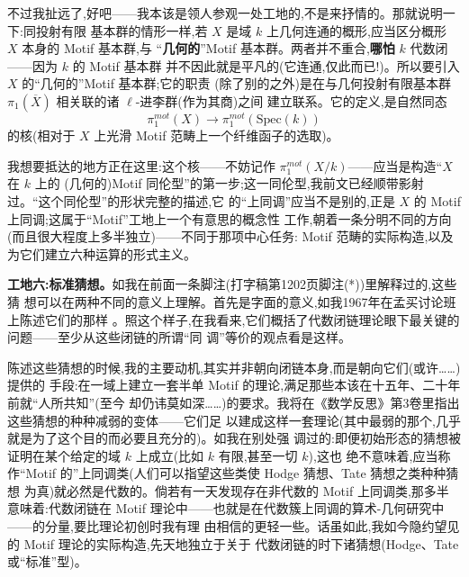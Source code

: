 不过我扯远了,好吧——我本该是领人参观一处工地的,不是来抒情的。那就说明一下:同投射有限
基本群的情形一样,若 $X$ 是域 $k$ 上几何连通的概形,应当区分概形 $X$ 本身的 Motif 基本群,与
“\textbf{几何的}”Motif 基本群。两者并不重合,\textbf{哪怕} $k$ 代数闭——因为 $k$ 的 Motif 基本群
并不因此就是平凡的(它连通,仅此而已!)。所以要引入 $X$ 的“几何的”Motif 基本群;它的职责
(除了别的之外)是在与几何投射有限基本群 $\pi_1(\overline{X})$ 相关联的诸 $\ell$-进李群(作为其商)之间
建立联系。它的定义,是自然同态
$$\pi_1^{mot}(X)\to\pi_1^{mot}(\mathrm{Spec}(k))$$
的核(相对于 $X$ 上光滑 Motif 范畴上一个纤维函子的选取)。

我想要抵达的地方正在这里:这个核——不妨记作 $\pi_1^{mot}(X/k)$——应当是构造“$X$ 在 $k$ 上的
(几何的)Motif 同伦型”的第一步;这一同伦型,我前文已经顺带影射过。“这个同伦型”的形状完整的描述,它
的“上同调”应当不是别的,正是 $X$ 的 Motif 上同调;这属于“Motif”工地上一个有意思的概念性
工作,朝着一条分明不同的方向\dmark{}(而且很大程度上多半独立)——不同于那项中心任务:
Motif 范畴的实际构造,以及为它们建立六种运算的形式主义。

\textbf{工地六:标准猜想。}如我在前面一条脚注(打字稿第1202页脚注(*))里解释过的,这些猜
想可以在两种不同的意义上理解。首先是字面的意义,如我1967年在孟买讨论班上陈述它们的那样
。照这个样子,在我看来,它们概括了代数闭链理论眼下最关键的问题——至少从这些闭链的所谓“同
调”等价的观点看是这样。

陈述这些猜想的时候,我的主要动机,其实并非朝向闭链本身,而是朝向它们(或许……)提供的
手段:在一域上建立一套半单 Motif 的理论,满足那些本该在十五年、二十年前就“人所共知”(至今
却仍讳莫如深……)的要求。我将在《数学反思》第3卷里指出这些猜想的种种减弱的变体——它们足
以建成这样一套理论(其中最弱的那个,几乎就是为了这个目的而必要且充分的)。如我在别处强
调过的:即便初始形态的猜想被证明在某个给定的域 $k$ 上成立(比如 $k$ 有限,甚至一切 $k$),这也
绝不意味着,应当称作“Motif 的”上同调类(人们可以指望这些类使 Hodge 猜想、Tate 猜想之类种种猜想
为真)就必然是代数的。倘若有一天发现存在非代数的 Motif 上同调类,那多半意味着:代数闭链在
Motif 理论中——也就是在代数簇上同调的算术-几何研究中——的分量,要比理论初创时我有理
由相信的更轻一些。话虽如此,我如今隐约望见的 Motif 理论的实际构造,先天地独立于关于
代数闭链的时下诸猜想(Hodge、Tate 或“标准”型)。


